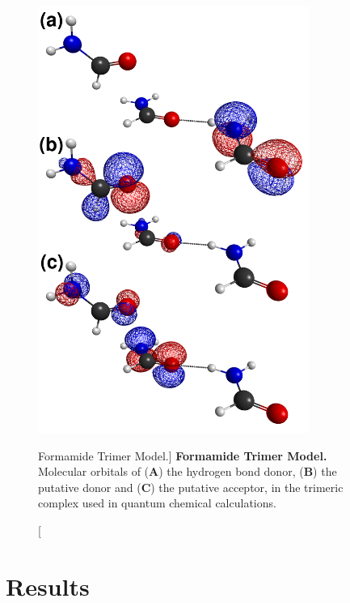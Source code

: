 \begin{figure}
\includegraphics[width=3.5in]{figs/npistar/04.png}
\caption
      [Formamide Trimer Model.]{
  {\bf Formamide Trimer Model.}
  \\
  Molecular orbitals of ({\bf A}) the hydrogen bond donor, ({\bf B}) the
  putative \npipistar{} donor and ({\bf C}) the putative \npipistar{} acceptor,
  in the trimeric complex used in quantum chemical calculations.
}
\end{figure}

\section{Results}

